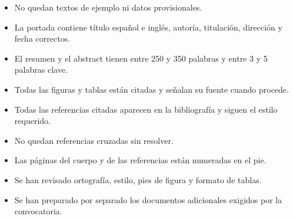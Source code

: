 \begin{itemize}
    \item No quedan textos de ejemplo ni datos provisionales.
    \item La portada contiene título español e inglés, autoría, titulación, dirección y fecha correctos.
    \item El resumen y el abstract tienen entre 250 y 350 palabras y entre 3 y 5 palabras clave.
    \item Todas las figuras y tablas están citadas y señalan su fuente cuando procede.
    \item Todas las referencias citadas aparecen en la bibliografía y siguen el estilo requerido.
    \item No quedan referencias cruzadas sin resolver.
    \item Las páginas del cuerpo y de las referencias están numeradas en el pie.
    \item Se han revisado ortografía, estilo, pies de figura y formato de tablas.
    \item Se han preparado por separado los documentos adicionales exigidos por la convocatoria.
\end{itemize}
